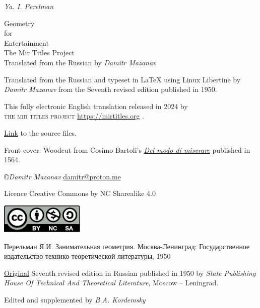 

\cleardoublepage
\thispagestyle{empty}
\begin{fullwidth}
\begin{center}

{\LARGE \emph{Ya. I. Perelman}}

{\Huge Geometry\\ for \\ Entertainment}\\[2cm]




The Mir Titles Project\\

{\small Translated from the Russian by \emph{Damitr Mazanav}}

\end{center}
\end{fullwidth}
\cleardoublepage

\thispagestyle{empty}
\vfill
\begin{small}

{\noindent

Translated from the Russian and typeset in \LaTeX{} using Linux Libertine by \emph{Damitr Mazanav} from the Seventh revised edition published in 1950.


This fully electronic English translation released in 2024 by \\\textsc{the mir titles project} \url{https://mirtitles.org} .

\href{https://gitlab.com/mirtitles/perelman-geometry}{Link} to the source files. 
 
Front cover: Woodcut from Cosimo Bartoli's \href{https://archive.org/details/cosimobartolidel00bart}{\emph{Del modo di misvrare}} published in 1564. 

\copyright \emph{Damitr Mazanav} \href{mailto:damitr@proton.me}{damitr@proton.me}

Licence Creative Commons by NC Sharealike 4.0

\includegraphics[width=0.3\textwidth]{figures/Cc-by-nc-sa_icon.pdf}

Перельман Я.И. Занимательная геометрия. Москва-Ленинград: Государственное издательство технико-теоретической литературы, 1950

\href{https://archive.org/details/20220910_perelman_geometry/}{Original} Seventh revised edition in Russian published in 1950 by  \emph{State Publishing House Of Technical And Theoretical Literature}, Moscow -- Leningrad.

Edited and supplemented by \emph{B.A. Kordemsky}
}

\end{small}

